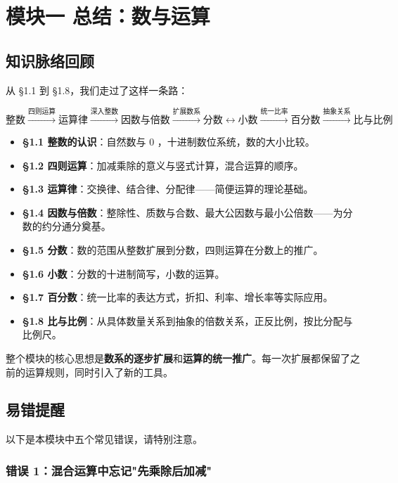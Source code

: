 \chapter*{模块一 总结：数与运算}


\section*{知识脉络回顾}


从 §1.1 到 §1.8，我们走过了这样一条路：

\[
\text{整数} \xrightarrow{\text{四则运算}} \text{运算律} \xrightarrow{\text{深入整数}} \text{因数与倍数} \xrightarrow{\text{扩展数系}} \text{分数} \longleftrightarrow \text{小数} \xrightarrow{\text{统一比率}} \text{百分数} \xrightarrow{\text{抽象关系}} \text{比与比例}
\]


\begin{itemize}
  \item \textbf{§1.1 整数的认识}：自然数与 $0$ ，十进制数位系统，数的大小比较。
  \item \textbf{§1.2 四则运算}：加减乘除的意义与竖式计算，混合运算的顺序。
  \item \textbf{§1.3 运算律}：交换律、结合律、分配律——简便运算的理论基础。
  \item \textbf{§1.4 因数与倍数}：整除性、质数与合数、最大公因数与最小公倍数——为分数的约分通分奠基。
  \item \textbf{§1.5 分数}：数的范围从整数扩展到分数，四则运算在分数上的推广。
  \item \textbf{§1.6 小数}：分数的十进制简写，小数的运算。
  \item \textbf{§1.7 百分数}：统一比率的表达方式，折扣、利率、增长率等实际应用。
  \item \textbf{§1.8 比与比例}：从具体数量关系到抽象的倍数关系，正反比例，按比分配与比例尺。
\end{itemize}


整个模块的核心思想是\textbf{数系的逐步扩展}和\textbf{运算的统一推广}。每一次扩展都保留了之前的运算规则，同时引入了新的工具。

\section*{易错提醒}


以下是本模块中五个常见错误，请特别注意。

\subsection*{错误 1：混合运算中忘记"先乘除后加减"}


